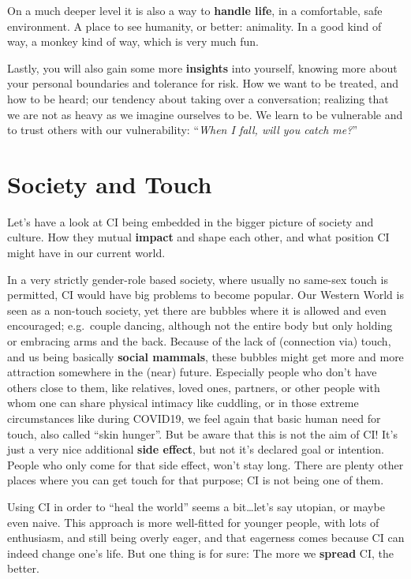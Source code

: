 On a much deeper level it is also a way to \textbf{handle life}, in a comfortable, safe environment.
A place to see humanity, or better: animality.
In a good kind of way, a monkey kind of way, which is very much fun.

Lastly, you will also gain some more \textbf{insights} into yourself, knowing more about your personal boundaries and tolerance for risk.
How we want to be treated, and how to be heard;
our tendency about taking over a conversation; realizing that we are not as heavy as we imagine ourselves to be.
We learn to be vulnerable and to trust others with our vulnerability: ``\textit{When I fall, will you catch me?}''

\section{Society and Touch}\label{sec:society-and-touch}

Let's have a look at CI being embedded in the bigger picture of society and culture.
How they mutual \textbf{impact} and shape each other, and what position CI might have in our current world.

In a very strictly gender-role based society, where usually no same-sex touch is permitted, CI would have big problems to become popular.
Our Western World is seen as a non-touch society, yet there are bubbles where it is allowed and even encouraged; e.g.\ couple dancing, although not the entire body but only holding or embracing arms and the back.
Because of the lack of (connection via) touch, and us being basically \textbf{social mammals}, these bubbles might get more and more attraction somewhere in the (near) future.
Especially people who don't have others close to them, like relatives, loved ones, partners, or other people with whom one can share physical intimacy like cuddling, or in those extreme circumstances like during COVID19, we feel again that basic human need for touch, also called ``skin hunger''.
But be aware that this is not the aim of CI!
It's just a very nice additional \textbf{side effect}, but not it's declared goal or intention.
People who only come for that side effect, won't stay long.
There are plenty other places where you can get touch for that purpose; CI is not being one of them.

Using CI in order to ``heal the world'' seems a bit\ldots let's say utopian, or maybe even naive.
This approach is more well-fitted for younger people, with lots of enthusiasm, and still being overly eager, and that eagerness comes because CI can indeed change one's life.
But one thing is for sure: The more we \textbf{spread} CI, the better.

